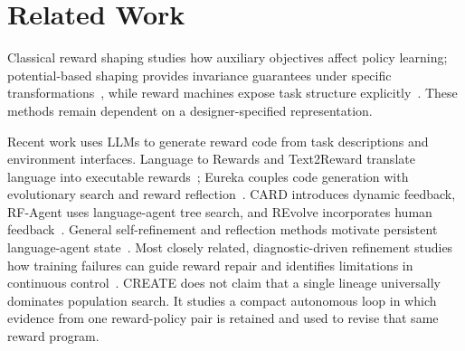 \section{Related Work}
Classical reward shaping studies how auxiliary objectives affect policy learning; potential-based shaping provides invariance guarantees under specific transformations~\cite{ng1999policy}, while reward machines expose task structure explicitly~\cite{rewardmachines}. These methods remain dependent on a designer-specified representation.

Recent work uses LLMs to generate reward code from task descriptions and environment interfaces. Language to Rewards and Text2Reward translate language into executable rewards~\cite{language2rewards,text2reward}; Eureka couples code generation with evolutionary search and reward reflection~\cite{eureka}. CARD introduces dynamic feedback, RF-Agent uses language-agent tree search, and REvolve incorporates human feedback~\cite{card,rfagent,revolve}. General self-refinement and reflection methods motivate persistent language-agent state~\cite{selfrefine,reflexion}. Most closely related, diagnostic-driven refinement studies how training failures can guide reward repair and identifies limitations in continuous control~\cite{wang2026diagnostic}. CREATE does not claim that a single lineage universally dominates population search. It studies a compact autonomous loop in which evidence from one reward-policy pair is retained and used to revise that same reward program.
